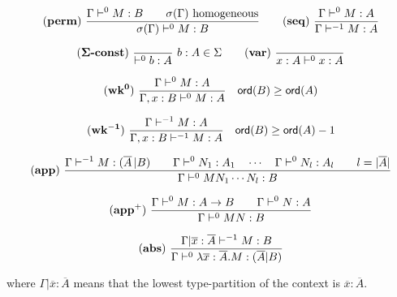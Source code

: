 \begin{table}[htbp]
$$  \mathbf{(perm)} \
    \frac{\displaystyle 
      { \Gamma \vdash^0 M:B \qquad \sigma(\Gamma)  } \hbox{ homogeneous}
    }{ \sigma(\Gamma) \vdash^0 M : B
    }
\qquad
\mathbf{(seq)} \  \frac{\displaystyle \Gamma \vdash^{0} M : A}{\Gamma \vdash^{-1} M : A}
$$

$$
\mathbf{(\Sigma\mbox{\textbf{-const}})} \  \frac{\displaystyle }{\vdash^0 b : A}\ b:A \in \Sigma
\qquad
 \mathbf{(var)} \   \frac{\displaystyle }{x : A\vdash^{0} x : A} $$

$$ \mathbf{(wk^{0})} \   \frac{\displaystyle \Gamma \vdash^{0} M : A}{\Gamma , x : B \vdash^{0} M : A} \quad {\sf ord}(B) \geq {\sf ord}(A) $$

$$ \mathbf{(wk^{-1})} \   \frac{\displaystyle \Gamma \vdash^{-1} M : A}{\Gamma , x : B \vdash^{-1} M : A} \quad {\sf ord}(B) \geq {\sf ord}(A) -1$$


$$ \mathbf{(app)} \
    \frac{\displaystyle    \Gamma \vdash^{-1} M : (\overline{A} \, | B)
            \qquad
            \Gamma \vdash^0 N_1 : A_1 \quad \cdots \quad \Gamma \vdash^0 N_{l} : A_l \qquad l = |\overline{A}|
        }{
            \Gamma \vdash^0 M N_1 \cdots N_{l} : B
        }
$$

$$ \mathbf{(app^+)} \   \frac{\displaystyle \Gamma \vdash^0 M : A\rightarrow B
                                        \qquad \Gamma \vdash^{0} N : A
                                   }{\Gamma  \vdash^{0} M N : B}$$

$$ \mathbf{(abs)} \   \frac{\displaystyle \Gamma| \overline{x} : \overline{A} \vdash^{-1} M : B}{\Gamma  \vdash^{0} \lambda \overline{x} : \overline{A} . M : (\overline{A}|B)}$$


where $\Gamma| \overline{x} : \overline{A}$ means that the lowest type-partition of the context is
$\overline{x} : \overline{A}$.
\caption{Alternative rules for the homogeneous safe lambda calculus}
\label{tab:homosafelmd_rules_refined}
\end{table}
